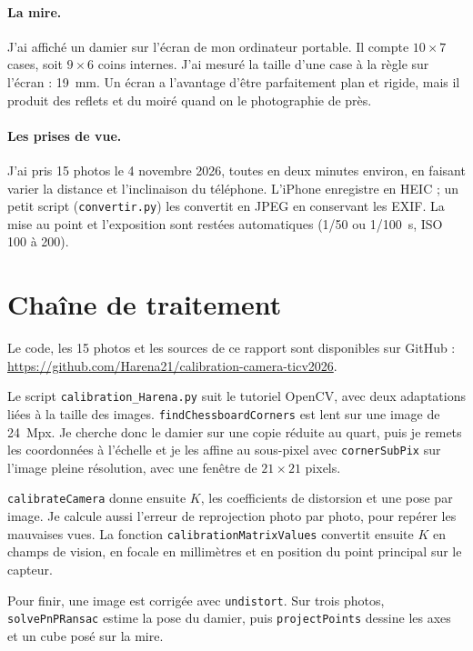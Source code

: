 \documentclass[11pt,a4paper]{article}
\begin{document}
\paragraph{La mire.} J'ai affiché un damier sur l'écran de mon ordinateur portable. Il compte $10\times7$ cases, soit $9\times6$ coins internes. J'ai mesuré la taille d'une case à la règle sur l'écran : 19~mm. Un écran a l'avantage d'être parfaitement plan et rigide, mais il produit des reflets et du moiré quand on le photographie de près.

\paragraph{Les prises de vue.} J'ai pris 15 photos le 4 novembre 2026, toutes en deux minutes environ, en faisant varier la distance et l'inclinaison du téléphone. L'iPhone enregistre en HEIC ; un petit script (\texttt{convertir.py}) les convertit en JPEG en conservant les EXIF. La mise au point et l'exposition sont restées automatiques (1/50 ou 1/100~s, ISO 100 à 200).

\section{Chaîne de traitement}

Le code, les 15 photos et les sources de ce rapport sont disponibles sur GitHub : \url{https://github.com/Harena21/calibration-camera-ticv2026}.

Le script \texttt{calibration\_Harena.py} suit le tutoriel OpenCV, avec deux adaptations liées à la taille des images.
\texttt{findChessboardCorners} est lent sur une image de 24~Mpx. Je cherche donc le damier sur une copie réduite au quart, puis je remets les coordonnées à l'échelle et je les affine au sous-pixel avec \texttt{cornerSubPix} sur l'image pleine résolution, avec une fenêtre de $21\times21$ pixels.

\texttt{calibrateCamera} donne ensuite $K$, les coefficients de distorsion et une pose par image. Je calcule aussi l'erreur de reprojection photo par photo, pour repérer les mauvaises vues.
La fonction \texttt{calibrationMatrixValues} convertit ensuite $K$ en champs de vision, en focale en millimètres et en position du point principal sur le capteur.

Pour finir, une image est corrigée avec \texttt{undistort}. Sur trois photos, \texttt{solvePnPRansac} estime la pose du damier, puis \texttt{projectPoints} dessine les axes et un cube posé sur la mire.
\end{document}
